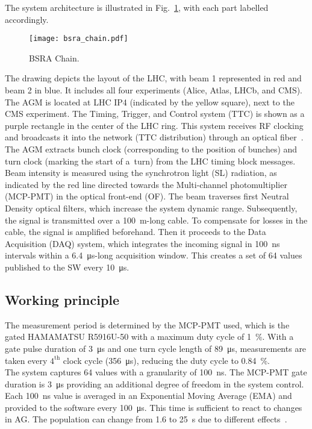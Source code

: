 The system architecture is illustrated in
Fig.~\ref{fig:bsra_chain}, with each part labelled accordingly.
\begin{figure}[!tbh]
    \centering
    \texttt{[image: bsra\_chain.pdf]}
    \caption{BSRA Chain.}
    \label{fig:bsra_chain}
\end{figure} 
The drawing depicts the layout of the LHC, with beam 1 represented
in red and beam 2 in blue. It includes all four experiments (Alice, Atlas,
LHCb, and CMS). The AGM is located at LHC IP4 (indicated by the yellow
square), next to the CMS experiment. The Timing, Trigger, and Control system
(TTC) is shown as a purple rectangle in the center of the LHC ring. This system
receives RF clocking and broadcasts it into the network (TTC
distribution) through an optical fiber~\cite{ttc_distribution}. The AGM extracts bunch clock 
(corresponding to the position of bunches) and turn clock (marking
the start of a~turn) from the LHC timing block messages.\\
Beam intensity is measured using the synchrotron light (SL) radiation, as indicated by the red line directed towards the Multi-channel photomultiplier
(MCP-PMT) in the optical front-end (OF). The beam traverses first Neutral Density optical filters, which increase the system dynamic range. Subsequently, the signal is
transmitted over a \SI{100}{m}-long cable. To compensate for losses in the cable,
the signal is amplified beforehand. Then it proceeds to the Data Acquisition
(DAQ) system, which integrates the incoming signal in \SI{100}{\nano\second} intervals within a \SI{6.4}{\micro\second}-long acquisition window. This creates a set of 64 values published to
the SW every \SI{10}{\micro\second}.

\subsection{Working principle}
The measurement period is determined by the MCP-PMT used, which is the gated
HAMAMATSU R5916U-50 with a maximum duty cycle of \SI{1}{\%}. With a gate pulse duration
of \SI{3}{\micro\second} and one turn cycle length of \SI{89}{\micro\second},
measurements are taken every $4^{\text{th}}$ clock cycle (\SI{356}{\micro\second}),
reducing the duty cycle to \SI{0.84}{\%}.\\
The system captures 64 values with a granularity of \SI{100}{\nano\second}. The
MCP-PMT gate duration is \SI{3}{\micro\second} providing an additional degree of
freedom in the system control. Each \SI{100}{\nano\second} value is averaged in an
 Exponential Moving Average (EMA) and provided to the software every \SI{100}{\micro\second}. This
time is sufficient to react to changes in AG. The population can change from
1.6 to \SI{25}{\second} due to different
effects~\cite{high_sensitivity_measurement}.

